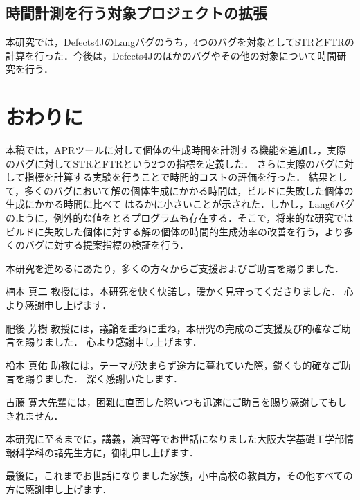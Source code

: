 \documentclass[uplatex,dvipdfmx,a4paper]{jsarticle}
\begin{document}
\subsection{時間計測を行う対象プロジェクトの拡張}
本研究では，Defects4JのLangバグのうち，4つのバグを対象としてSTRとFTRの計算を行った．今後は，Defects4Jのほかのバグやその他の対象について時間研究を行う．
\clearpage
\section{おわりに}\label{sec:concl}
本稿では，APRツールに対して個体の生成時間を計測する機能を追加し，実際のバグに対してSTRとFTRという2つの指標を定義した．
さらに実際のバグに対して指標を計算する実験を行うことで時間的コストの評価を行った．
結果として，多くのバグにおいて解の個体生成にかかる時間は，ビルドに失敗した個体の生成にかかる時間に比べて	はるかに小さいことが示された．しかし，Lang6バグのように，例外的な値をとるプログラムも存在する．そこで，将来的な研究ではビルドに失敗した個体に対する解の個体の時間的生成効率の改善を行う，より多くのバグに対する提案指標の検証を行う．
\clearpage
\acknowledgement

本研究を進めるにあたり，多くの方々からご支援およびご助言を賜りました．

楠本 真二 教授には，本研究を快く快諾し，暖かく見守ってくださりました．
心より感謝申し上げます．

肥後 芳樹 教授には，議論を重ねに重ね，本研究の完成のご支援及び的確なご助言を賜りました．
心より感謝申し上げます．

柗本 真佑 助教には，テーマが決まらず途方に暮れていた際，鋭くも的確なご助言を賜りました．
深く感謝いたします．

古藤 寛大先輩には，困難に直面した際いつも迅速にご助言を賜り感謝してもしきれません．

本研究に至るまでに，講義，演習等でお世話になりました大阪大学基礎工学部情報科学科の諸先生方に，御礼申し上げます．

最後に，これまでお世話になりました家族，小中高校の教員方，その他すべての方に感謝申し上げます．
\clearpage


\end{document}
